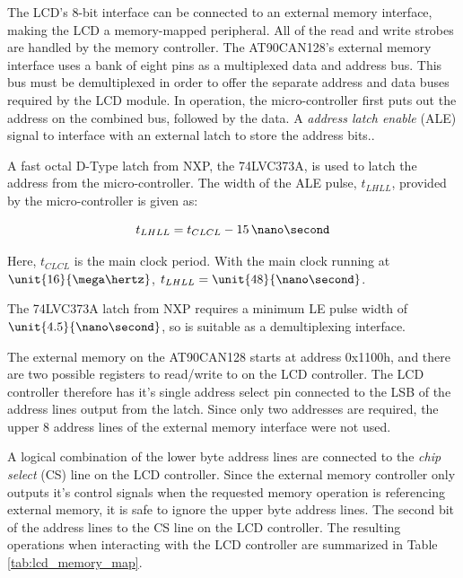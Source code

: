 The LCD's 8-bit interface can be connected to an external memory interface, making the LCD a memory-mapped peripheral. All of the read and write strobes are handled by the memory controller. The AT90CAN128's external memory interface uses a bank of eight pins as a multiplexed data and address bus. This bus must be demultiplexed in order to offer the separate address and data buses required by the LCD module. In operation, the micro-controller first puts out the address on the combined bus, followed by the data. A \emph{address latch enable} (ALE) signal to interface with an external latch to store the address bits.\cite{AT90CAN}.

A fast octal D-Type latch from NXP, the 74LVC373A, is used to latch the address from the micro-controller. The width of the ALE pulse, $t_{LHLL}$, provided by the micro-controller is given as:


\begin{equation}
t_{LHLL}=t_{CLCL}-15\, \nano\second
\end{equation}

Here, $t_{CLCL}$ is the main clock period. With the main clock running at $\unit{16}{\mega\hertz}$, $t_{LHLL}=\unit{48}{\nano\second}$.


The 74LVC373A latch from NXP requires a minimum LE pulse width of $\unit{4.5}{\nano\second}$, so is suitable as a demultiplexing interface.

The external memory on the AT90CAN128 starts at address 0x1100h, and there are two possible registers to read/write to on the LCD controller. The LCD controller therefore has it's single address select pin connected to the LSB of the address lines output from the latch. Since only two addresses are required, the upper 8 address lines of the external memory interface were not used.


A logical combination of the lower byte address lines are connected to the \emph{chip select} (CS) line on the LCD controller. Since the external memory controller only outputs it's control signals when the requested memory operation is referencing external memory, it is safe to ignore the upper byte address lines. The second bit of the address lines to the CS line on the LCD controller. The resulting operations when interacting with the LCD controller are summarized in Table \ref{tab:lcd_memory_map}.

